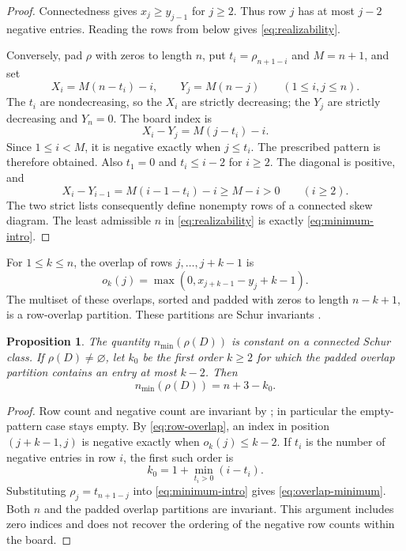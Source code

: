 \documentclass[11pt,a4paper]{amsart}
\numberwithin{equation}{section}
\theoremstyle{plain}
\newtheorem{proposition}[theorem]{Proposition}
\theoremstyle{definition}
\begin{document}
\begin{proof}
Connectedness gives \(x_j\ge y_{j-1}\) for \(j\ge2\).  Thus row \(j\) has at most \(j-2\) negative entries.  Reading the rows from below gives \eqref{eq:realizability}.

Conversely, pad \(\rho\) with zeros to length \(n\), put \(t_i=\rho_{n+1-i}\) and \(M=n+1\), and set
\begin{equation}\label{eq:realizing-lists}
 X_i=M(n-t_i)-i,\qquad Y_j=M(n-j)
 \qquad(1\le i,j\le n).
\end{equation}
The \(t_i\) are nondecreasing, so the \(X_i\) are strictly decreasing; the \(Y_j\) are strictly decreasing and \(Y_n=0\).  The board index is
\[
 X_i-Y_j=M(j-t_i)-i.
\]
Since \(1\le i<M\), it is negative exactly when \(j\le t_i\).  The prescribed pattern is therefore obtained.  Also \(t_1=0\) and \(t_i\le i-2\) for \(i\ge2\).  The diagonal is positive, and
\[
 X_i-Y_{i-1}=M(i-1-t_i)-i\ge M-i>0
 \qquad(i\ge2).
\]
The two strict lists consequently define nonempty rows of a connected skew diagram.  The least admissible \(n\) in \eqref{eq:realizability} is exactly \eqref{eq:minimum-intro}.
\end{proof}

For \(1\le k\le n\), the overlap of rows \(j,\ldots,j+k-1\) is
\begin{equation}\label{eq:row-overlap}
 o_k(j)=\max(0,x_{j+k-1}-y_j+k-1).
\end{equation}
The multiset of these overlaps, sorted and padded with zeros to length \(n-k+1\), is a row-overlap partition.  These partitions are Schur invariants \cite{Reiner2007Coincidences}.

\begin{proposition}\label{prop:minimal-row-invariant}
The quantity \(n_{\min}(\rho(D))\) is constant on a connected Schur class.  If \(\rho(D)\ne\varnothing\), let \(k_0\) be the first order \(k\ge2\) for which the padded overlap partition contains an entry at most \(k-2\).  Then
\begin{equation}\label{eq:overlap-minimum}
 n_{\min}(\rho(D))=n+3-k_0.
\end{equation}
\end{proposition}

\begin{proof}
Row count and negative count are invariant by ; in particular the empty-pattern case stays empty.  By \eqref{eq:row-overlap}, an index in position \((j+k-1,j)\) is negative exactly when \(o_k(j)\le k-2\).  If \(t_i\) is the number of negative entries in row \(i\), the first such order is
\[
 k_0=1+\min_{t_i>0}(i-t_i).
\]
Substituting \(\rho_j=t_{n+1-j}\) into \eqref{eq:minimum-intro} gives \eqref{eq:overlap-minimum}.  Both \(n\) and the padded overlap partitions are invariant.  This argument includes zero indices and does not recover the ordering of the negative row counts within the board.
\end{proof}
\end{document}

